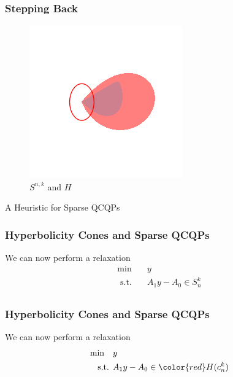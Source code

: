 \documentclass{beamer}
\newcommand{\st}{{\text{ s.t. }}}
\begin{document}
\begin{frame}
    \frametitle{Stepping Back}
    \begin{figure}[h]
        \centering
        \includegraphics[width=0.6\linewidth]{comparison_circle.png}
        \caption{$S^{n,k}$ and $H$}%
        \label{fig:just_snk}
    \end{figure}
\end{frame}
\begin{frame}
    \centering
    \huge
    {\color{gray}A Heuristic for Sparse QCQPs}
\end{frame}
\begin{frame}
    \frametitle{Hyperbolicity Cones and Sparse QCQPs}
    We can now perform a relaxation
    \begin{equation*}
        \begin{aligned}
            \min\quad & y\\
            \st & A_1y - A_0 \in S^k_n\\
        \end{aligned}
    \end{equation*}
\end{frame}
\begin{frame}
    \frametitle{Hyperbolicity Cones and Sparse QCQPs}
    We can now perform a relaxation
        \begin{equation*}
            \begin{aligned}
                \min\quad & y\\
                \st & A_1y - A_0 \in {\color{red} H(c_n^k)}\\
            \end{aligned}
        \end{equation*}
    \pause
\end{frame}
\end{document}
